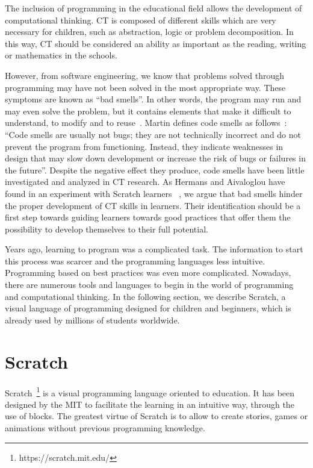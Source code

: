 The inclusion of programming in the educational field allows the development of computational thinking. CT is composed of different skills which are very necessary for children, such as abstraction, logic or problem decomposition. In this way, CT should be considered an ability as important as the reading, writing or mathematics in the schools.

However, from software engineering, we know that problems solved through programming may have not been solved in the most appropriate way. These symptoms are known as ``bad smells''. In other words, the program may run and may even solve the problem, but it contains elements that make it difficult to understand, to modify and to reuse~\cite{zhang:_badsmells}. Martin defines code smells as follows~\cite{martin:_clean}: ``Code smells are usually not bugs; they are not technically incorrect and do not prevent the program from functioning. Instead, they indicate weaknesses in design that may slow down development or increase the risk of bugs or failures in the future''. Despite the negative effect they produce, code smells have been little investigated and analyzed in CT research. As Hermans and Aivaloglou have found in an experiment with Scratch learners ~\cite{felienne:_hamper}, we argue that bad smells hinder the proper development of CT skills in learners. Their identification should be a first step towards guiding learners towards good practices that offer them the possibility to develop themselves to their full potential.

Years ago, learning to program was a complicated task. The information to start this process was scarcer and the programming languages less intuitive. Programming based on best practices was even more complicated. Nowadays, there are numerous tools and languages to begin in the world of programming and computational thinking. In the following section, we describe Scratch, a visual language of programming designed for children and beginners, which is already used by millions of students worldwide.


\section{Scratch}
\label{sec:scratch}

Scratch~\footnote{https://scratch.mit.edu/} is a visual programming language oriented to education. It has been designed by the MIT to facilitate the learning in an intuitive way, through the use of blocks. The greatest virtue of Scratch is to allow to create stories, games or animations without previous programming knowledge.

